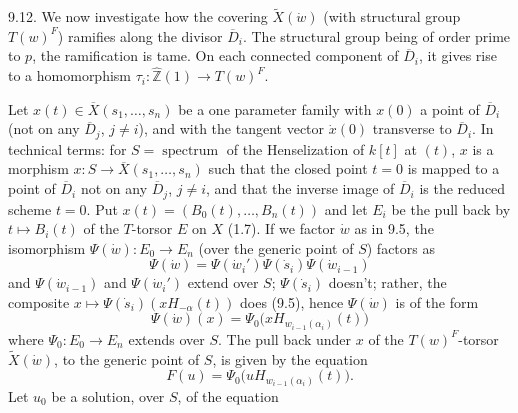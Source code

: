 \documentclass[9pt,twoside]{extarticle}
\begin{document}
{9.12. We now investigate how the covering \(\widetilde X(\dot w)\) (with structural group \(T(w)^F\)) ramifies along the divisor \(\overline D_i\). The structural group being of order prime to \(p\), the ramification is tame. On each connected component of \(\overline D_i\), it gives rise to a homomorphism \(\tau_i:\widehat{\mathbb Z}(1)\to T(w)^F\).\par

Let \(x(t)\in\overline X(s_1,\ldots,s_n)\) be a one parameter family with \(x(0)\) a point of \(\overline D_i\) (not on any \(\overline D_j\), \(j\ne i\)), and with the tangent vector \(\dot x(0)\) transverse to \(\overline D_i\). In technical terms: for \(S=\operatorname{spectrum}\) of the Henselization of \(k[t]\) at \((t)\), \(x\) is a morphism \(x:S\to\overline X(s_1,\ldots,s_n)\) such that the closed point \(t=0\) is mapped to a point of \(\overline D_i\) not on any \(\overline D_j\), \(j\ne i\), and that the inverse image of \(\overline D_i\) is the reduced scheme \(t=0\). Put \(x(t)=(B_0(t),\ldots,B_n(t))\) and let \(E_i\) be the pull back by \(t\mapsto B_i(t)\) of the \(T\)-torsor \(E\) on \(X\) (1.7). If we factor \(\dot w\) as in 9.5, the isomorphism \(\Psi(\dot w):E_0\to E_n\) (over the generic point of \(S\)) factors as \[
\Psi(\dot w)=\Psi(\dot w_i')\Psi(\dot s_i)\Psi(\dot w_{i-1})
\] and \(\Psi(\dot w_{i-1})\) and \(\Psi(\dot w_i')\) extend over \(S\); \(\Psi(\dot s_i)\) doesn't; rather, the composite \(x\mapsto\Psi(\dot s_i)(xH_{-\alpha}(t))\) does (9.5), hence \(\Psi(\dot w)\) is of the form \[
\Psi(\dot w)(x)=\Psi_0\bigl(xH_{w_{i-1}(\alpha_i)}(t)\bigr)
\] where \(\Psi_0:E_0\to E_n\) extends over \(S\). The pull back under \(x\) of the \(T(w)^F\)-torsor \(\widetilde X(\dot w)\), to the generic point of \(S\), is given by the equation \[
\tag{9.12.1}
F(u)=\Psi_0\bigl(uH_{w_{i-1}(\alpha_i)}(t)\bigr).
\] Let \(u_0\) be a solution, over \(S\), of the equation\par
}
\end{document}
